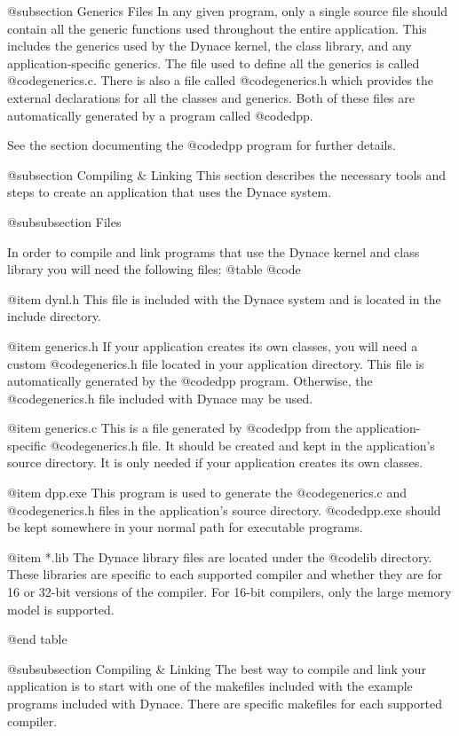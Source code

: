 @subsection Generics Files
In any given program, only a single source file should contain all the
generic functions used throughout the entire application.  This includes
the generics used by the Dynace kernel, the class library, and any
application-specific generics.  The file used to define all the generics
is called @code{generics.c}.  There is also a file called @code{generics.h}
which provides the external declarations for all the classes and
generics.  Both of these files are automatically generated by a program
called @code{dpp}.

See the section documenting the @code{dpp} program for further
details.


@subsection Compiling & Linking
This section describes the necessary tools and steps to create
an application that uses the Dynace system.

@subsubsection Files

In order to compile and link programs that use the Dynace kernel and class
library you will need the following files:
@table @code

@item dynl.h
This file is included with the Dynace system and is located in the
include directory.

@item generics.h
If your application creates its own classes, you will need a custom
@code{generics.h} file located in your application directory.
This file is automatically generated by the @code{dpp} program.
Otherwise, the @code{generics.h} file included with Dynace may
be used.

@item generics.c
This is a file generated by @code{dpp} from the application-specific
@code{generics.h} file.  It should be created and kept in the
application's source directory.  It is only needed if your application
creates its own classes.

@item dpp.exe
This program is used to generate the @code{generics.c} and
@code{generics.h} files in the application's source directory.
@code{dpp.exe} should be kept somewhere in your normal path for
executable programs.

@item *.lib
The Dynace library files are located under the @code{lib} directory.
These libraries are specific to each supported compiler and whether
they are for 16 or 32-bit versions of the compiler.  For 16-bit
compilers, only the large memory model is supported.

@end table

@subsubsection Compiling & Linking
The best way to compile and link your application is to start with one
of the makefiles included with the example programs included with Dynace.
There are specific makefiles for each supported compiler.

